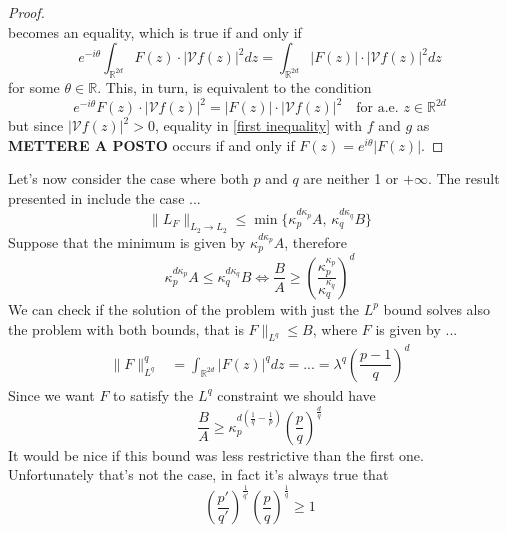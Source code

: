 \documentclass[corpo=11pt, stile=classica, tipotesi=custom,
greek, evenboxes, english]{toptesi}
\numberwithin{equation}{chapter}
\newcommand{\R}{\mathbb{R}} %
\newcommand{\V}{\mathcal{V}} %
\begin{document}
\begin{proof}
\begin{equation*}
	\end{equation*}
	becomes an equality, which is true if and only if
	\begin{equation*}
		e^{-i\theta}  \int_{\R^{2d}} F(z) \cdot |\V f(z)|^2 dz = \int_{\R^{2d}} |F(z)| \cdot | \V f(z)|^2 dz
	\end{equation*}
	for some $\theta \in \R$. This, in turn, is equivalent to the condition
	\begin{equation*}
		e^{-i \theta}F(z) \cdot |\V f(z)|^2 = |F(z)| \cdot |\V f(z)|^2 \quad \text{for a.e. } z \in \R^{2d}
	\end{equation*}
	but since $|\V f(z)|^2 > 0$, equality in \ref{first inequality} with $f$ and $g$ as \textbf{METTERE A POSTO} occurs if and only if $F(z) = e^{i \theta} |F(z)|$.
\end{proof}







Let's now consider the case where both $p$ and $q$ are neither 1 or $+\infty$. The result presented in \cite{nicolatilli_norm} include the case ...
\begin{equation*}
	\| L_F\|_{L_2 \rightarrow L_2} \leq \min\{\kappa_p^{d\kappa_p}A, \, \kappa_q^{d\kappa_q}B\}
\end{equation*}
Suppose that the minimum is given by $\kappa_p^{d\kappa_p}A$, therefore
\begin{equation*}
	\kappa_p^{d\kappa_p}A \leq \kappa_q^{d\kappa_q}B \iff \dfrac{B}{A} \geq \left(\dfrac{\kappa_p^{\kappa_p}}{\kappa_q^{\kappa_q}}\right)^d
\end{equation*}
We can check if the solution of the problem with just the $L^p$ bound solves also the problem with both bounds, that is $F\|_{L^q} \leq B$, where $F$ is given by ...
\begin{align*}
	\| F \|_{L^q}^q &= \int_{\R^{2d}} |F(z)|^q dz = ... = \lambda^q \left(\dfrac{p-1}{q}\right)^d
\end{align*}
Since we want $F$ to satisfy the $L^q$ constraint we should have
\begin{equation*}
	\dfrac{B}{A} \geq \kappa_p^{d\left(\frac1q - \frac1p\right)}\left(\dfrac{p}{q}\right)^{\frac{d}{q}}
\end{equation*}
It would be nice if this bound was less restrictive than the first one. Unfortunately that's not the case, in fact it's always true that
\begin{equation*}
	\left(\dfrac{p'}{q'}\right)^{\frac1{q'}} \left(\dfrac{p}{q}\right)^{\frac1q} \geq 1
\end{equation*}
\end{document}
